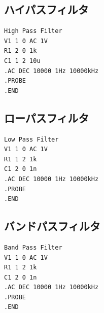 \documentclass{jlreq}
\numberwithin{equation}{section}
\begin{document}
\subsection{ハイパスフィルタ}
\begin{verbatim}
High Pass Filter
V1 1 0 AC 1V
R1 2 0 1k
C1 1 2 10u
.AC DEC 10000 1Hz 10000kHz
.PROBE
.END
\end{verbatim}

\subsection{ローパスフィルタ}
\begin{verbatim}
Low Pass Filter
V1 1 0 AC 1V
R1 1 2 1k
C1 2 0 1n
.AC DEC 10000 1Hz 10000kHz
.PROBE
.END
\end{verbatim}

\subsection{バンドパスフィルタ}
\begin{verbatim}
Band Pass Filter
V1 1 0 AC 1V
R1 1 2 1k
C1 2 0 1n
.AC DEC 10000 1Hz 10000kHz
.PROBE
.END
\end{verbatim}
\end{document}
